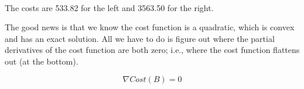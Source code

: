 \begin{fullwidth}
\\

\noindent The costs are 533.82 for the left and 3563.50 for the right.

The good news is that we know the cost function is a quadratic, which is convex and has an exact solution. All we have to do is figure out where the partial derivatives of the cost function are both zero; i.e., where the cost function flattens out (at the bottom).

\[\tag{Analytic solution to optimization}
\nabla Cost(B) = 0
\]


\end{fullwidth}
